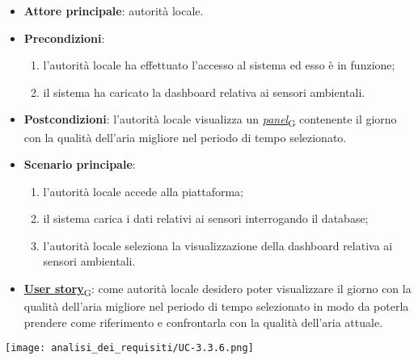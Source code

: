 \begin{itemize}
	\item \textbf{Attore principale}: autorità locale.
	\item \textbf{Precondizioni}:
	      \begin{enumerate}
		      \item l'autorità locale ha effettuato l'accesso al sistema ed esso è in funzione;
		      \item il sistema ha caricato la dashboard relativa ai sensori ambientali.
	      \end{enumerate}
	\item \textbf{Postcondizioni}: l'autorità locale visualizza un \href{https://7last.github.io/docs/pb/documentazione-interna/glossario\#panel}{\textit{panel}\textsubscript{G}} contenente il giorno con la qualità dell'aria migliore nel periodo di tempo selezionato.
	\item \textbf{Scenario principale}:
	      \begin{enumerate}
		      \item l'autorità locale accede alla piattaforma;
		      \item il sistema carica i dati relativi ai sensori interrogando il database;
		      \item l'autorità locale seleziona la visualizzazione della dashboard relativa ai sensori ambientali.
	      \end{enumerate}
	\item \href{https://7last.github.io/docs/pb/documentazione-interna/glossario\#user-story}{\textbf{User story}\textsubscript{G}}:
	      come autorità locale desidero poter visualizzare il giorno con la qualità dell'aria migliore nel periodo di tempo selezionato
	      in modo da poterla prendere come riferimento e confrontarla con la qualità dell'aria attuale.
\end{itemize}
\begin{center}
	\texttt{[image: analisi\_dei\_requisiti/UC-3.3.6.png]}
\end{center}

